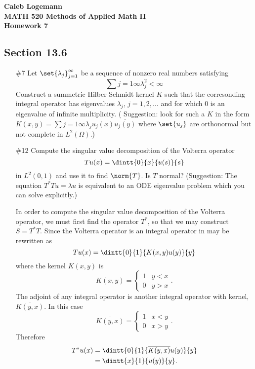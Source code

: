 \documentclass[11pt, oneside]{article}
\begin{document}
\noindent \textbf{\Large{Caleb Logemann \\
MATH 520 Methods of Applied Math II \\
Homework 7
}}

\subsection*{Section 13.6}
\begin{enumerate}
  \item[\#7]
    Let $\set{\lambda_j}_{j = 1}^{\infty}$ be a sequence of nonzero real
    numbers satisfying
    \[
      \sum{j = 1}{\infty}{\lambda_j^2} < \infty
    \]
    Construct a summetric Hilber Schmidt kernel $K$ such that the corresonding
    integral operator has eigenvalues $\lambda_j$, $j = 1, 2, \ldots$ and for
    which $0$ is an eigenvalue of infinite multiplicity.
    ( Suggestion: look for such a $K$ in the form
    $K(x, y) = \sum{j = 1}{\infty}{\lambda_j u_j(x) \overline{u_j(y)}}$ where
    $\set{u_j}$ are orthonormal but not complete in $L^2(\Omega)$.)

  \pagebreak
  \item[\#12]
    Compute the singular value decomposition of the Volterra operator
    \[
      Tu(x) = \dintt{0}{x}{u(s)}{s}
    \]
    in $L^2(0, 1)$ and use it to find $\norm{T}$.
    Is $T$ normal?
    (Suggestion: The equation $T^* T u = \lambda u$ is equivalent to an ODE
    eigenvalue problem which you can solve explicitly.)

    In order to compute the singular value decomposition of the Volterra
    operator, we must first find the operator $T^*$, so that we may construct
    $S = T^* T$.
    Since the Volterra operator is an integral operator in may be rewritten as
    \[
      Tu(x) = \dintt{0}{1}{K(x, y)u(y)}{y}
    \]
    where the kernel $K(x, y)$ is
    \[
      K(x, y) =
      \begin{cases}
        1 & y < x \\
        0 & y > x
      \end{cases}.
    \]
    The adjoint of any integral operator is another integral operator with
    kernel, $\overline{K(y, x)}$.
    In this case
    \[
      \overline{K(y, x)} =
      \begin{cases}
        1 & x < y \\
        0 & x > y
      \end{cases}.
    \]
    Therefore
    \begin{align*}
      T^* u(x) &= \dintt{0}{1}{\overline{K(y, x)}u(y)}{y} \\
      &= \dintt{x}{1}{u(y)}{y}.
    \end{align*}


\end{enumerate}
\end{document}
